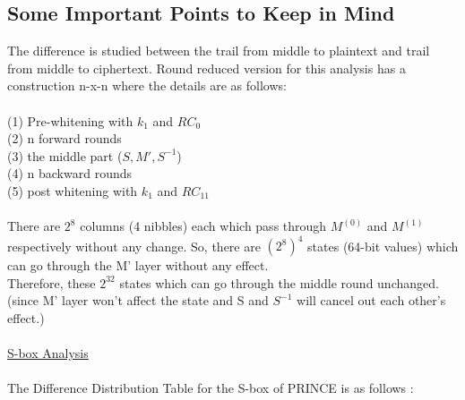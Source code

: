 \documentclass{transcrypto}
\begin{document}
\subsection{Some Important Points to Keep in Mind}
The difference is studied between the trail from middle to plaintext and trail from middle to ciphertext. Round reduced version for this analysis has a construction n-x-n where the details are as follows: \\ \\
(1) Pre-whitening with $k_1$ and $RC_0$ \\
(2) n forward rounds \\
(3) the middle part ($S, M', S^{-1}$) \\
(4) n backward rounds \\
(5) post whitening with $k_1$ and $RC_{11}$ \\ \\
There are $2^8$ columns (4 nibbles) each which pass through $M^(0)$ and $M^(1)$ respectively without any change.
So, there are $(2^8)^4$ states (64-bit values) which can go through the M' layer without any effect. \\ 
Therefore, these $2^{32}$ states which can go through the middle round unchanged. (since M' layer won't affect the state and S and $S^{-1}$ will cancel out each other's effect.) \\ \\
\underline{S-box Analysis} \\  \\ 
The Difference Distribution Table for the S-box of PRINCE is as follows : \\ \\
\end{document}
